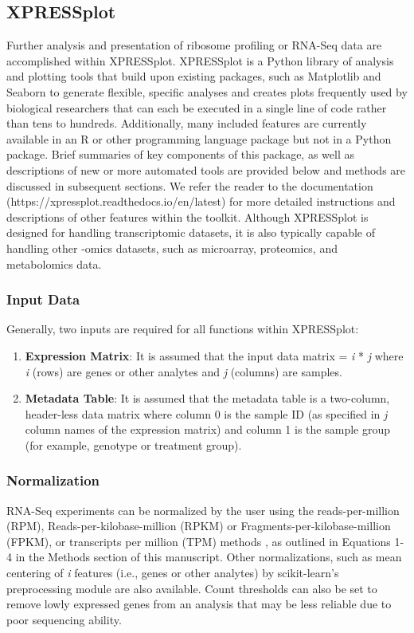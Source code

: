 \documentclass[10pt, oneside]{article}
\begin{document}
\subsection{XPRESSplot}
Further analysis and presentation of ribosome profiling or RNA-Seq data are accomplished within XPRESSplot. XPRESSplot is a Python library of analysis and plotting tools that build upon existing packages, such as Matplotlib \cite{matplotlib} and Seaborn \cite{seaborn} to generate flexible, specific analyses and creates plots frequently used by biological researchers that can each be executed in a single line of code rather than tens to hundreds. Additionally, many included features are currently available in an R or other programming language package but not in a Python package. Brief summaries of key components of this package, as well as descriptions of new or more automated tools are provided below and methods are discussed in subsequent sections. We refer the reader to the documentation (https://xpressplot.readthedocs.io/en/latest) for more detailed instructions and descriptions of other features within the toolkit. Although XPRESSplot is designed for handling transcriptomic datasets, it is also typically capable of handling other -omics datasets, such as microarray, proteomics, and metabolomics data.

\subsubsection{Input Data}
Generally, two inputs are required for all functions within XPRESSplot:

\begin{enumerate}
  \item \textbf{Expression Matrix}: It is assumed that the input data matrix = \textit{i} * \textit{j} where \textit{i} (rows) are genes or other analytes and \textit{j} (columns) are samples.
  \item \textbf{Metadata Table}: It is assumed that the metadata table is a two-column, header-less data matrix where column 0 is the sample ID (as specified in \textit{j} column names of the expression matrix) and column 1 is the sample group (for example, genotype or treatment group).
\end{enumerate}

\subsubsection{Normalization}
RNA-Seq experiments can be normalized by the user using the reads-per-million (RPM), Reads-per-kilobase-million (RPKM) or Fragments-per-kilobase-million (FPKM), or transcripts per million (TPM) methods \cite{evans_briefbio}, as outlined in Equations 1-4 in the Methods section of this manuscript. Other normalizations, such as mean centering of \textit{i} features (i.e., genes or other analytes) by scikit-learn's preprocessing module \cite{scikit_learn} are also available. Count thresholds can also be set to remove lowly expressed genes from an analysis that may be less reliable due to poor sequencing ability.
\end{document}
